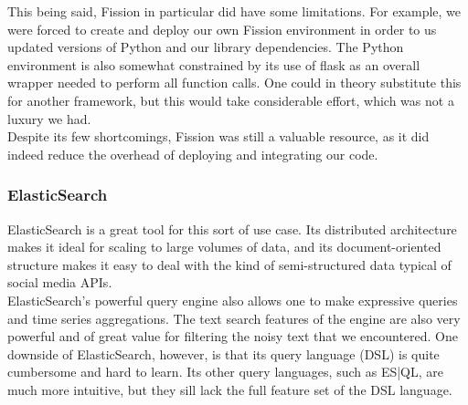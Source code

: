 This being said, Fission in particular did have some limitations. For example, we were forced to create and deploy our own Fission environment in order to us updated versions of Python and our library dependencies. The Python environment is also somewhat constrained by its use of flask as an overall wrapper needed to perform all function calls. One could in theory substitute this for another framework, but this would take considerable effort, which was not a luxury we had.
\\

Despite its few shortcomings, Fission was still a valuable resource, as it did indeed reduce the overhead of deploying and integrating our code.

\subsubsection{ElasticSearch}
ElasticSearch is a great tool for this sort of use case. Its distributed architecture makes it ideal for scaling to large volumes of data, and its document-oriented structure makes it easy to deal with the kind of semi-structured data typical of social media APIs. 
\\

ElasticSearch's powerful query engine also allows one to make expressive queries and time series aggregations. The text search features of the engine are also very powerful and of great value for filtering the noisy text that we encountered. One downside of ElasticSearch, however, is that its query language (DSL) is quite cumbersome and hard to learn. Its other query languages, such as ES|QL, are much more intuitive, but they sill lack the full feature set of the DSL language.
 